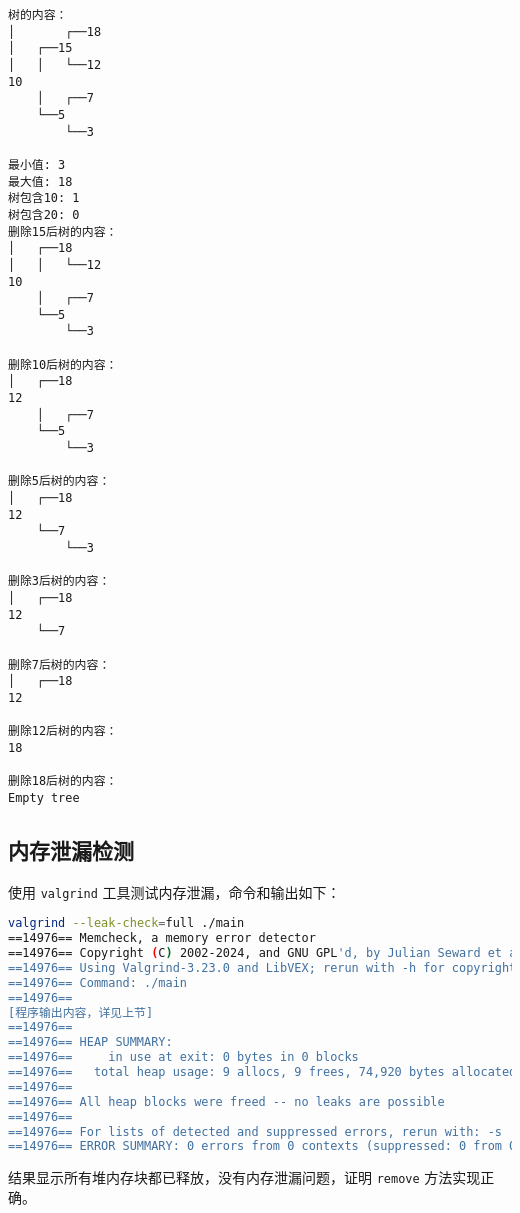 \documentclass[UTF8]{ctexart}
\begin{document}
\begin{lstlisting}[language={}, caption=程序输出]
树的内容：
│       ┌──18
│   ┌──15
│   │   └──12
10
    │   ┌──7
    └──5
        └──3

最小值: 3
最大值: 18
树包含10: 1
树包含20: 0
删除15后树的内容：
│   ┌──18
│   │   └──12
10
    │   ┌──7
    └──5
        └──3

删除10后树的内容：
│   ┌──18
12
    │   ┌──7
    └──5
        └──3

删除5后树的内容：
│   ┌──18
12
    └──7
        └──3

删除3后树的内容：
│   ┌──18
12
    └──7

删除7后树的内容：
│   ┌──18
12

删除12后树的内容：
18

删除18后树的内容：
Empty tree
\end{lstlisting}

\subsection{内存泄漏检测}

使用 \verb|valgrind| 工具测试内存泄漏，命令和输出如下：

\begin{lstlisting}[language=bash, caption=Valgrind 输出]
valgrind --leak-check=full ./main
==14976== Memcheck, a memory error detector
==14976== Copyright (C) 2002-2024, and GNU GPL'd, by Julian Seward et al.
==14976== Using Valgrind-3.23.0 and LibVEX; rerun with -h for copyright info
==14976== Command: ./main
==14976== 
[程序输出内容，详见上节]
==14976== 
==14976== HEAP SUMMARY:
==14976==     in use at exit: 0 bytes in 0 blocks
==14976==   total heap usage: 9 allocs, 9 frees, 74,920 bytes allocated
==14976== 
==14976== All heap blocks were freed -- no leaks are possible
==14976== 
==14976== For lists of detected and suppressed errors, rerun with: -s
==14976== ERROR SUMMARY: 0 errors from 0 contexts (suppressed: 0 from 0)
\end{lstlisting}

结果显示所有堆内存块都已释放，没有内存泄漏问题，证明 \verb|remove| 方法实现正确。
\end{document}
